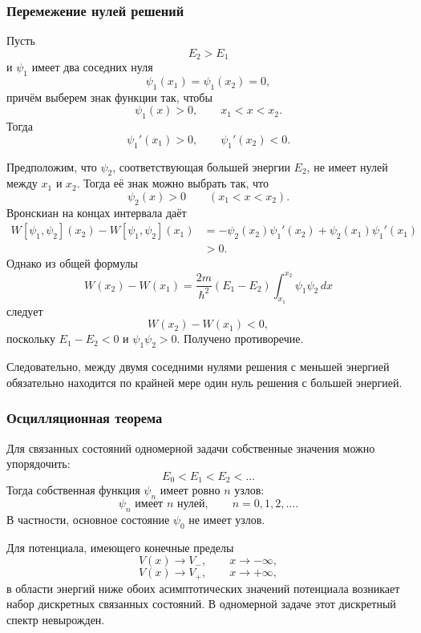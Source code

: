 \documentclass[12pt,a4paper]{article}
\begin{document}
\subsubsection{Перемежение нулей решений}

Пусть
\[
    E_2>E_1
\]
и $\psi_1$ имеет два соседних нуля
\[
    \psi_1(x_1)=\psi_1(x_2)=0,
\]
причём выберем знак функции так, чтобы
\[
    \psi_1(x)>0,
    \qquad
    x_1<x<x_2.
\]
Тогда
\[
    \psi_1'(x_1)>0,
    \qquad
    \psi_1'(x_2)<0.
\]

Предположим, что $\psi_2$, соответствующая большей энергии $E_2$, не
имеет нулей между $x_1$ и $x_2$. Тогда её знак можно выбрать так, что
\[
    \psi_2(x)>0
    \qquad
    (x_1<x<x_2).
\]
Вронскиан на концах интервала даёт
\[
\begin{aligned}
    W[\psi_1,\psi_2](x_2)
    -
    W[\psi_1,\psi_2](x_1)
    &=
    -\psi_2(x_2)\psi_1'(x_2)
    +
    \psi_2(x_1)\psi_1'(x_1)
    \\
    &>0.
\end{aligned}
\]
Однако из общей формулы
\[
    W(x_2)-W(x_1)
    =
    \frac{2m}{\hbar^2}
    (E_1-E_2)
    \int_{x_1}^{x_2}\psi_1\psi_2\,dx
\]
следует
\[
    W(x_2)-W(x_1)<0,
\]
поскольку $E_1-E_2<0$ и $\psi_1\psi_2>0$. Получено противоречие.

Следовательно, между двумя соседними нулями решения с меньшей энергией
обязательно находится по крайней мере один нуль решения с большей
энергией.


\subsubsection{Осцилляционная теорема}

Для связанных состояний одномерной задачи собственные значения можно
упорядочить:
\[
    E_0<E_1<E_2<\ldots
\]
Тогда собственная функция $\psi_n$ имеет ровно $n$ узлов:
\[
    \boxed{
        \psi_n
        \text{ имеет }n\text{ нулей},
        \qquad
        n=0,1,2,\ldots
    }.
\]
В частности, основное состояние $\psi_0$ не имеет узлов.

Для потенциала, имеющего конечные пределы
\[
    V(x)\to V_-,
    \qquad x\to-\infty,
\]
\[
    V(x)\to V_+,
    \qquad x\to+\infty,
\]
в области энергий ниже обоих асимптотических значений потенциала
возникает набор дискретных связанных состояний. В одномерной задаче
этот дискретный спектр невырожден.
\end{document}
